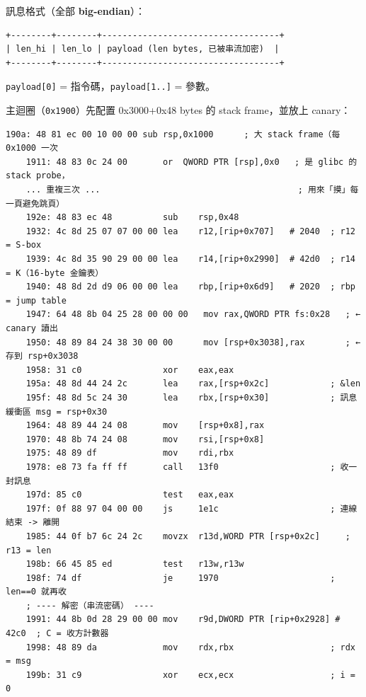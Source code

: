 \documentclass[10pt,a4paper]{article}
\begin{document}
訊息格式（全部 \textbf{big-endian}）：

\begin{Verbatim}[breaklines=true,breakanywhere=true,breakautoindent=false,fontsize=\fontsize{7.0}{9.5}\selectfont]
+--------+--------+-----------------------------------+
| len_hi | len_lo | payload (len bytes, 已被串流加密)  |
+--------+--------+-----------------------------------+
\end{Verbatim}

\texttt{payload{[}0{]}} = 指令碼，\texttt{payload{[}1..{]}} = 參數。

主迴圈（\texttt{0x1900}）先配置 0x3000+0x48 bytes 的 stack frame，並放上
canary：

\begin{Verbatim}[breaklines=true,breakanywhere=true,breakautoindent=false,fontsize=\fontsize{7.0}{9.5}\selectfont]
    190a: 48 81 ec 00 10 00 00 sub rsp,0x1000      ; 大 stack frame（每 0x1000 一次
    1911: 48 83 0c 24 00       or  QWORD PTR [rsp],0x0   ; 是 glibc 的 stack probe，
    ... 重複三次 ...                                       ; 用來「摸」每一頁避免跳頁）
    192e: 48 83 ec 48          sub    rsp,0x48
    1932: 4c 8d 25 07 07 00 00 lea    r12,[rip+0x707]   # 2040  ; r12 = S-box
    1939: 4c 8d 35 90 29 00 00 lea    r14,[rip+0x2990]  # 42d0  ; r14 = K（16-byte 金鑰表）
    1940: 48 8d 2d d9 06 00 00 lea    rbp,[rip+0x6d9]   # 2020  ; rbp = jump table
    1947: 64 48 8b 04 25 28 00 00 00   mov rax,QWORD PTR fs:0x28   ; ← canary 讀出
    1950: 48 89 84 24 38 30 00 00      mov [rsp+0x3038],rax        ; ← 存到 rsp+0x3038
    1958: 31 c0                xor    eax,eax
    195a: 48 8d 44 24 2c       lea    rax,[rsp+0x2c]            ; &len
    195f: 48 8d 5c 24 30       lea    rbx,[rsp+0x30]            ; 訊息緩衝區 msg = rsp+0x30
    1964: 48 89 44 24 08       mov    [rsp+0x8],rax
    1970: 48 8b 74 24 08       mov    rsi,[rsp+0x8]
    1975: 48 89 df             mov    rdi,rbx
    1978: e8 73 fa ff ff       call   13f0                      ; 收一封訊息
    197d: 85 c0                test   eax,eax
    197f: 0f 88 97 04 00 00    js     1e1c                      ; 連線結束 -> 離開
    1985: 44 0f b7 6c 24 2c    movzx  r13d,WORD PTR [rsp+0x2c]     ; r13 = len
    198b: 66 45 85 ed          test   r13w,r13w
    198f: 74 df                je     1970                      ; len==0 就再收
    ; ---- 解密（串流密碼） ----
    1991: 44 8b 0d 28 29 00 00 mov    r9d,DWORD PTR [rip+0x2928] # 42c0  ; C = 收方計數器
    1998: 48 89 da             mov    rdx,rbx                   ; rdx = msg
    199b: 31 c9                xor    ecx,ecx                   ; i = 0

\end{Verbatim}
\end{document}
